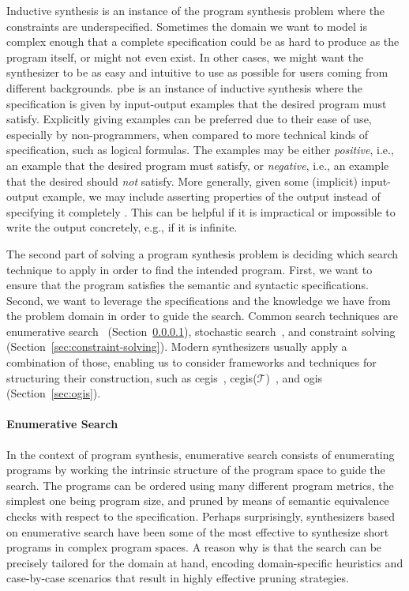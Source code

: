 Inductive synthesis is an instance of the program synthesis problem where the
constraints are underspecified.
Sometimes the domain we want to model is complex enough that a complete
specification could be as hard to produce as the program itself, or might not
even exist.
In other cases, we might want the synthesizer to be as easy and intuitive to use
as possible for users coming from different backgrounds.
\gls{pbe} is an instance of inductive synthesis where the specification is given
by input-output examples that the desired program must satisfy.
Explicitly giving examples can be preferred due to their ease of use, especially
by non-programmers, when compared to more technical kinds of specification, such
as logical formulas.
The examples may be either \textit{positive}, i.e., an example that the desired
program must satisfy, or \textit{negative}, i.e., an example that the desired
should \textit{not} satisfy.
More generally, given some (implicit) input-output example, we may include asserting
properties of the output instead of specifying it completely
\cite{Polozov:2015:FFI}.
This can be helpful if it is impractical or impossible
to write the output concretely, e.g., if it is infinite.


The second part of solving a program synthesis problem is deciding which search
technique to apply in order to find the intended program.
First, we want to ensure that the program satisfies the semantic and syntactic
specifications.
Second, we want to leverage the specifications and the knowledge we have from
the problem domain in order to guide the search.
Common search techniques are
enumerative search~\cite{Phothilimthana:2016:SUS,Alur:2017:SEP}
(Section~\ref{sec:enumerative-search}),
stochastic search~\cite{Schkufza:2013:SS,Singh:ranking:2015}, and
constraint solving~\cite{Feng:2018:PSU,Feng:2017:CST,Feng:2017:CSC}
(Section~\ref{sec:constraint-solving}).
Modern synthesizers usually apply a combination of those, enabling us to
consider frameworks and techniques for structuring their construction, such as
\gls{cegis}~\cite{Solar-Lezama:2008},
\gls{cegis}($\mathcal{T}$)~\cite{Abate:2018:CMT}, and
\gls{ogis}~\cite{Jha:2017:TFS}
(Section~\ref{sec:ogis}).

\paragraph{Enumerative Search}
\label{sec:enumerative-search}

In the context of program synthesis, enumerative search consists of enumerating
programs by working the intrinsic structure of the program space to guide the
search.
The programs can be ordered using many different program metrics, the simplest
one being program size, and pruned by means of semantic equivalence checks with
respect to the specification.
Perhaps surprisingly, synthesizers based on enumerative search have been some of
the most effective to synthesize short programs in complex program spaces.
A reason why is that the search can be precisely tailored for the domain at
hand, encoding domain-specific heuristics and case-by-case scenarios that
result in highly effective pruning strategies.

